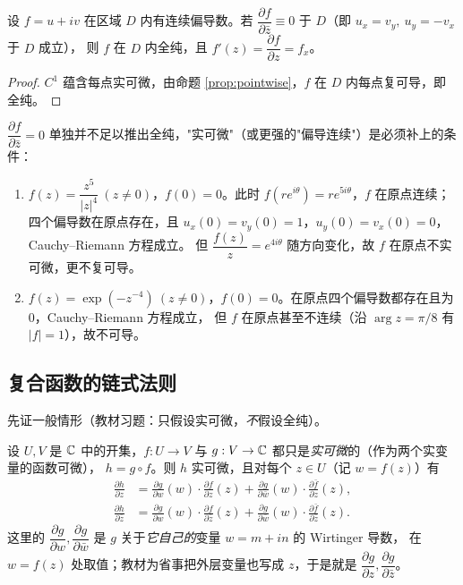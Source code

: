 \begin{proposition}[区域上：$C^1$ 版]\label{prop:region}
设 $f=u+iv$ 在区域 $D$ 内有连续偏导数。若
$\dfrac{\partial f}{\partial\bar z}\equiv0$ 于 $D$（即 $u_x=v_y,\ u_y=-v_x$ 于 $D$ 成立），
则 $f$ 在 $D$ 内全纯，且 $f'(z)=\dfrac{\partial f}{\partial z}=f_x$。
\end{proposition}

\begin{proof}
$C^1$ 蕴含每点实可微，由命题 \ref{prop:pointwise}，$f$ 在 $D$ 内每点复可导，即全纯。
\end{proof}

\begin{remark}\label{rem:cr-needs-differentiability}
$\dfrac{\partial f}{\partial\bar z}=0$ 单独并不足以推出全纯，"实可微"（或更强的"偏导连续"）是必须补上的条件：
\begin{enumerate}[label=(\arabic*), leftmargin=2.2em]
\item $f(z)=\dfrac{z^5}{|z|^4}\ (z\neq0)$，$f(0)=0$。此时 $f(re^{i\theta})=re^{5i\theta}$，$f$ 在原点连续；
四个偏导数在原点存在，且 $u_x(0)=v_y(0)=1$，$u_y(0)=v_x(0)=0$，Cauchy--Riemann 方程成立。
但 $\dfrac{f(z)}{z}=e^{4i\theta}$ 随方向变化，故 $f$ 在原点不实可微，更不复可导。
\item $f(z)=\exp(-z^{-4})\ (z\neq0)$，$f(0)=0$。在原点四个偏导数都存在且为 $0$，Cauchy--Riemann 方程成立，
但 $f$ 在原点甚至不连续（沿 $\arg z=\pi/8$ 有 $|f|=1$），故不可导。
\end{enumerate}
\end{remark}

\subsection{复合函数的链式法则}

先证一般情形（教材习题：只假设实可微，\emph{不}假设全纯）。

\begin{theorem}\label{thm:chain-general}
设 $U,V$ 是 $\mathbb{C}$ 中的开集，$f:U\to V$ 与 $g:V\to\mathbb{C}$ 都只是\emph{实可微}的（作为两个实变量的函数可微），
$h=g\circ f$。则 $h$ 实可微，且对每个 $z\in U$（记 $w=f(z)$）有
\begin{align}
\frac{\partial h}{\partial z}
&=\frac{\partial g}{\partial w}(w)\cdot\frac{\partial f}{\partial z}(z)
+\frac{\partial g}{\partial \bar w}(w)\cdot\frac{\partial \bar f}{\partial z}(z),\label{eq:chain-z}\\
\frac{\partial h}{\partial \bar z}
&=\frac{\partial g}{\partial w}(w)\cdot\frac{\partial f}{\partial \bar z}(z)
+\frac{\partial g}{\partial \bar w}(w)\cdot\frac{\partial \bar f}{\partial \bar z}(z).\label{eq:chain-barz}
\end{align}
这里的 $\dfrac{\partial g}{\partial w},\dfrac{\partial g}{\partial\bar w}$ 是 $g$ 关于\emph{它自己的}变量 $w=m+in$ 的 Wirtinger 导数，
在 $w=f(z)$ 处取值；教材为省事把外层变量也写成 $z$，于是就是 $\dfrac{\partial g}{\partial z},\dfrac{\partial g}{\partial\bar z}$。
\end{theorem}

